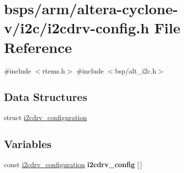 \hypertarget{i2cdrv-config_8h}{}\section{bsps/arm/altera-\/cyclone-\/v/i2c/i2cdrv-\/config.h File Reference}
\label{i2cdrv-config_8h}
{\ttfamily \#include $<$rtems.\+h$>$}\newline
{\ttfamily \#include $<$bsp/alt\+\_\+i2c.\+h$>$}\newline
\subsection*{Data Structures}
\begin{DoxyCompactItemize}
\item 
struct \mbox{\hyperlink{structi2cdrv__configuration}{i2cdrv\+\_\+configuration}}
\end{DoxyCompactItemize}
\subsection*{Variables}
\begin{DoxyCompactItemize}
\item 
\mbox{\label{i2cdrv-config_8h_aa7271e72fb46db9dffbda878ca9d18e9}} 
const \mbox{\hyperlink{structi2cdrv__configuration}{i2cdrv\+\_\+configuration}} {\bfseries i2cdrv\+\_\+config} \mbox{[}$\,$\mbox{]}
\end{DoxyCompactItemize}
